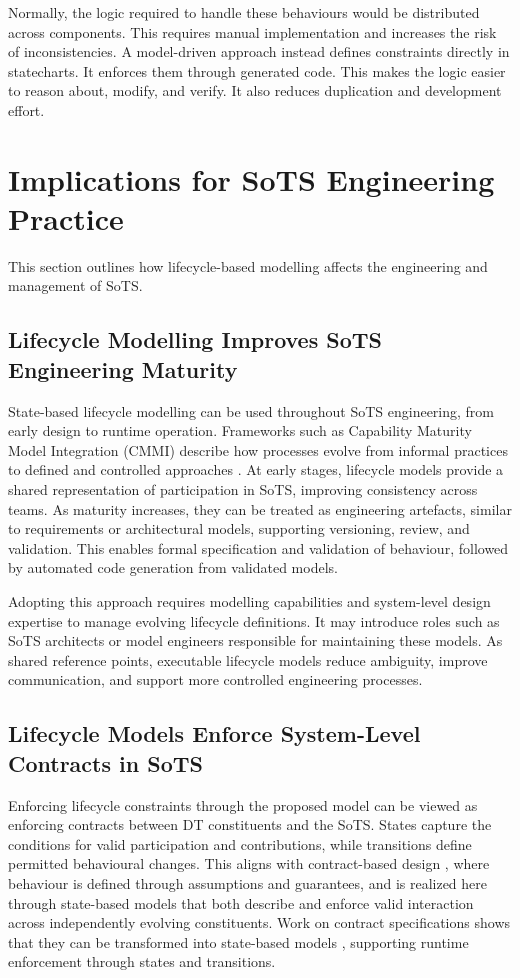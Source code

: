 Normally, the logic required to handle these behaviours would be distributed across components. This requires manual implementation and increases the risk of inconsistencies. A model-driven approach instead defines constraints directly in statecharts. It enforces them through generated code. This makes the logic easier to reason about, modify, and verify. It also reduces duplication and development effort.



\section{Implications for SoTS Engineering Practice}\label{sec:discussion-implications}
This section outlines how lifecycle-based modelling affects the engineering and management of SoTS.

\subsection{Lifecycle Modelling Improves SoTS Engineering Maturity}

State-based lifecycle modelling can be used throughout SoTS engineering, from early design to runtime operation. Frameworks such as Capability Maturity Model Integration (CMMI) describe how processes evolve from informal practices to defined and controlled approaches \cite{paulk1991capability}. At early stages, lifecycle models provide a shared representation of participation in SoTS, improving consistency across teams. As maturity increases, they can be treated as engineering artefacts, similar to requirements or architectural models, supporting versioning, review, and validation. This enables formal specification and validation of behaviour, followed by automated code generation from validated models.

Adopting this approach requires modelling capabilities and system-level design expertise to manage evolving lifecycle definitions. It may introduce roles such as SoTS architects or model engineers responsible for maintaining these models. As shared reference points, executable lifecycle models reduce ambiguity, improve communication, and support more controlled engineering processes.


\subsection{Lifecycle Models Enforce System-Level Contracts in SoTS}
Enforcing lifecycle constraints through the proposed model can be viewed as enforcing contracts between DT constituents and the SoTS. States capture the conditions for valid participation and contributions, while transitions define permitted behavioural changes. This aligns with contract-based design \cite{benveniste2012contracts}, where behaviour is defined through assumptions and guarantees, and is realized here through state-based models that both describe and enforce valid interaction across independently evolving constituents. Work on contract specifications shows that they can be transformed into state-based models \cite{bae2016systematic}, supporting runtime enforcement through states and transitions.

